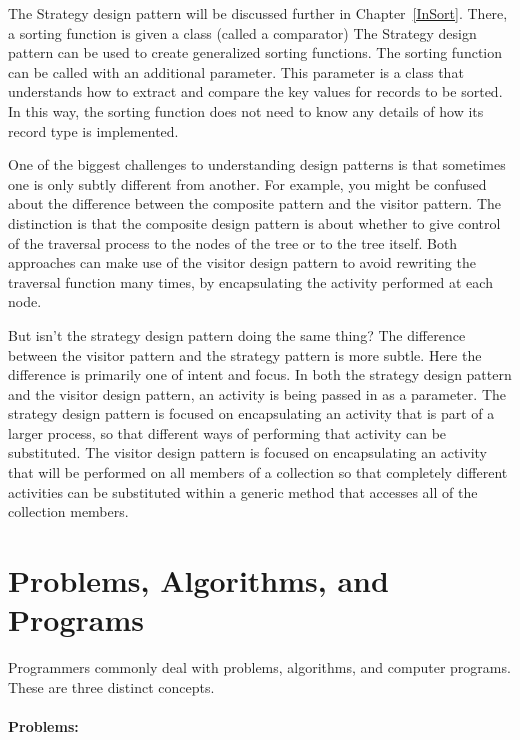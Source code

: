 {The Strategy design pattern will be discussed further in
Chapter~\ref{InSort}.
There, a sorting function is given a class (called a comparator)}{}
{The Strategy design pattern can be used to create generalized sorting
functions.
The sorting function can be called with an additional parameter.
This parameter is a class}{}
that understands how to extract and compare the key values for
records to be sorted.
In this way, the sorting function does not need to know any details
of how its record type is implemented.

One of the biggest challenges to understanding design patterns is that
sometimes one is only subtly different from another.
For example, you might be confused about the difference between the
composite pattern and the visitor pattern.
The distinction is that the composite design pattern is about whether
to give control of the traversal process to the nodes of the tree or to
the tree itself.
Both approaches can make use of the visitor design pattern to avoid
rewriting the traversal function many times, by 
encapsulating the activity performed at each node.

But isn't the strategy design pattern doing the same thing?
The difference between the visitor pattern and the strategy pattern is
more subtle.
Here the difference is primarily one of intent and focus.
In both the strategy design pattern and the visitor design pattern, an
activity is being passed in as a parameter.
The strategy design pattern is focused on encapsulating an activity
that is part of a larger process, so that different ways of
performing that activity can be substituted.
The visitor design pattern is focused on encapsulating an activity that
will be performed on all members of a collection so that completely
different activities can be substituted within a generic method that
accesses all of the collection members.


\section{Problems, Algorithms, and Programs}
\label{ProbAlgo}

Programmers commonly deal with problems, algorithms, and
computer programs.
These are three distinct concepts.

\paragraph{Problems:}

